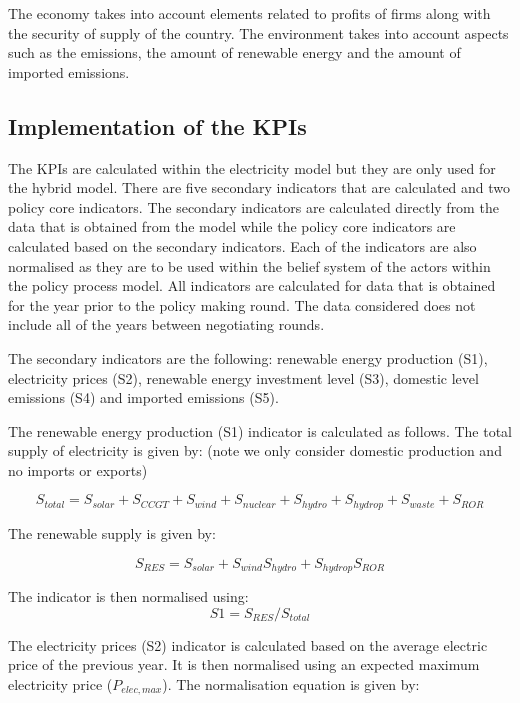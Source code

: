 \documentclass[12pt]{article}
\begin{document}
The economy takes into account elements related to profits of firms along with the security of supply of the country. The environment takes into account aspects such as the emissions, the amount of renewable energy and the amount of imported emissions.




\subsection{Implementation of the KPIs}

The KPIs are calculated within the electricity model but they are only used for the hybrid model. There are five secondary indicators that are calculated and two policy core indicators. The secondary indicators are calculated directly from the data that is obtained from the model while the policy core indicators are calculated based on the secondary indicators. Each of the indicators are also normalised as they are to be used within the belief system of the actors within the policy process model. All indicators are calculated for data that is obtained for the year prior to the policy making round. The data considered does not include all of the years between negotiating rounds.

The secondary indicators are the following: renewable energy production (S1), electricity prices (S2), renewable energy investment level (S3), domestic level emissions (S4) and imported emissions (S5).

The renewable energy production (S1) indicator is calculated as follows. The total supply of electricity is given by: (note we only consider domestic production and no imports or exports)

\begin{equation}
S_{total} = S_{solar} + S_{CCGT} + S_{wind} + S_{nuclear} + S_{hydro} + S_{hydrop} + S_{waste} + S_{ROR}
\end{equation}

The renewable supply is given by:

\begin{equation}
S_{RES} = S_{solar} + S_{wind} S_{hydro} + S_{hydrop} S_{ROR}
\end{equation}

The indicator is then normalised using:
\begin{equation}
S1 = S_{RES}  / S_{total}
\end{equation}

The electricity prices (S2) indicator is calculated based on the average electric price of the previous year. It is then normalised using an expected maximum electricity price ($P_{elec, max}$). The normalisation equation is given by:
\end{document}
